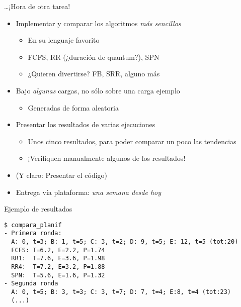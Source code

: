 \documentclass[presentation]{beamer}
\begin{document}
\begin{frame}[label={sec:org6d2057e}]{\ldots{}¡Hora de otra tarea!}
\begin{itemize}
\item Implementar y comparar los algoritmos \emph{más sencillos}
\begin{itemize}
\item En su lenguaje favorito
\item FCFS, RR (¿duración de quantum?), SPN
\item ¿Quieren divertirse? FB, SRR, alguno más
\end{itemize}
\item Bajo \emph{algunas} cargas, no sólo sobre una carga ejemplo
\begin{itemize}
\item Generadas de forma aleatoria
\end{itemize}
\item Presentar los resultados de varias ejecuciones
\begin{itemize}
\item Unos cinco resultados, para poder comparar un poco las tendencias
\item ¡Verifiquen manualmente algunos de los resultados!
\end{itemize}
\item (Y claro: Presentar el código)
\item Entrega vía plataforma: \emph{una semana desde hoy}
\end{itemize}
\end{frame}

\begin{frame}[label={sec:org6ec8ffc},fragile]{Ejemplo de resultados}
 \begin{verbatim}
$ compara_planif
- Primera ronda:
  A: 0, t=3; B: 1, t=5; C: 3, t=2; D: 9, t=5; E: 12, t=5 (tot:20)
  FCFS: T=6.2, E=2.2, P=1.74
  RR1:  T=7.6, E=3.6, P=1.98
  RR4:  T=7.2, E=3.2, P=1.88
  SPN:  T=5.6, E=1.6, P=1.32
- Segunda ronda
  A: 0, t=5; B: 3, t=3; C: 3, t=7; D: 7, t=4; E:8, t=4 (tot:23)
  (...)
\end{verbatim}
\end{frame}
\end{document}
